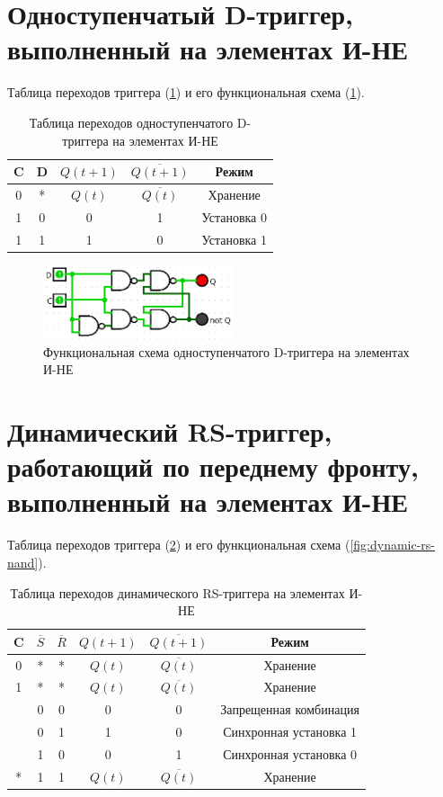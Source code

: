 \documentclass[14pt, a4paper]{extreport}
\newcommand\clockbt{%
	\begin{tikzpicture}[scale=0.25pt]
		\draw (0,0) -- (1,0) -- (1,1) -- (2,1);
	\end{tikzpicture}%
}
\begin{document}
\section{Одноступенчатый D-триггер, выполненный на элементах И-НЕ}
Таблица переходов триггера (\cref{tab:d-nand}) и его функциональная схема (\cref{fig:d-nand}).

\begin{table}[H]
	\caption{Таблица переходов одноступенчатого D-триггера на элементах И-НЕ}
	\label{tab:d-nand}
	\begin{tabular}{|c|c|c|c|c|}
		\hline
		C & D & $Q(t + 1)$ & $\overline{Q(t + 1)}$ & Режим \\
		\hline
		0 & * & $Q(t)$ & $\overline{Q(t)}$ & Хранение \\
		\hline
		1 & 0 & 0 & 1 & Установка 0 \\
		\hline
		1 & 1 & 1 & 0 & Установка 1 \\
		\hline
	\end{tabular}
\end{table}

\begin{figure}[H]
	\caption{\nohyphens{Функциональная схема одноступенчатого D-триггера на элементах И-НЕ}}
	\label{fig:d-nand}
	\includegraphics[width=0.5\textwidth]{d-nand}
\end{figure}

\section{Динамический RS-триггер, работающий по переднему фронту, выполненный на элементах И-НЕ}
Таблица переходов триггера (\cref{tab:dynamic-rs-nand}) и его функциональная схема (\cref{fig:dynamic-rs-nand}).

\begin{table}[H]
	\caption{Таблица переходов динамического RS-триггера на элементах И-НЕ}
	\label{tab:dynamic-rs-nand}
	\begin{tabular}{|c|c|c|c|c|c|}
		\hline
		C & $\overline{S}$ & $\overline{R}$ & $Q(t + 1)$ & $\overline{Q(t + 1)}$ & Режим \\
		\hline
		0 & * & * & $Q(t)$ & $\overline{Q(t)}$ & Хранение \\
		\hline
		1 & * & * & $Q(t)$ & $\overline{Q(t)}$ & Хранение \\
		\hline
		\clockbt & 0 & 0 & 0 & 0 & Запрещенная комбинация \\
		\hline
		\clockbt & 0 & 1 & 1 & 0 & Синхронная установка 1 \\
		\hline
		\clockbt & 1 & 0 & 0 & 1 & Синхронная установка 0 \\
		\hline
		* & 1 & 1 & $Q(t)$ & $\overline{Q(t)}$ & Хранение \\
		\hline
	\end{tabular}
\end{table}
\end{document}

